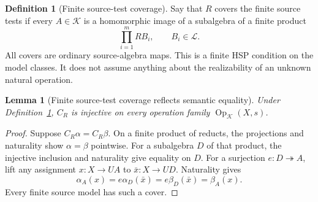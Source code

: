 \documentclass[11pt]{article}
\newtheorem{lemma}[theorem]{Lemma}
\theoremstyle{definition}
\newtheorem{definition}[theorem]{Definition}
\theoremstyle{remark}
\newcommand{\Op}{\operatorname{Op}}
\begin{document}
\begin{definition}[Finite source-test coverage]\label{alg-def:cover}
Say that $R$ covers the finite source tests if every $A\in\mathcal K$
is a homomorphic image of a subalgebra of a finite product
\[
                   \prod_{i=1}^m RB_i,
                   \qquad B_i\in\mathcal L.
\]
All covers are ordinary source-algebra maps. This is a finite HSP
condition on the model classes. It does not assume anything about the
realizability of an unknown natural operation.
\end{definition}

\begin{lemma}[Finite source-test coverage reflects semantic equality]
\label{alg-lem:faithful}
Under Definition~\ref{alg-def:cover}, $C_R$ is injective on every operation
family $\Op_{\mathcal K}(X,s)$.
\end{lemma}
\begin{proof}
Suppose $C_R\alpha=C_R\beta$. On a finite product of reducts, the
projections and naturality show $\alpha=\beta$ pointwise. For a subalgebra
$D$ of that product, the injective inclusion and naturality give equality
on $D$. For a surjection $e:D\twoheadrightarrow A$, lift any assignment
$x:X\to UA$ to $\bar x:X\to UD$. Naturality gives
\[
 \alpha_A(x)=e\alpha_D(\bar x)=e\beta_D(\bar x)=\beta_A(x).
\]
Every finite source model has such a cover.
\end{proof}
\end{document}
